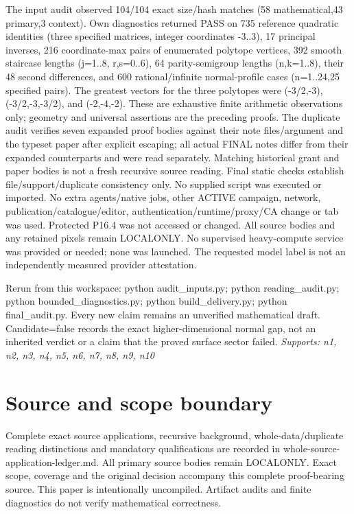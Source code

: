 \documentclass[11pt]{article}
\begin{document}
The input audit observed 104/104 exact size/hash matches (58 mathematical,43 primary,3 context). Own diagnostics returned PASS on 735 reference quadratic identities (three specified matrices, integer coordinates -3..3), 17 principal inverses, 216 coordinate-max pairs of enumerated polytope vertices, 392 smooth staircase lengths (j=1..8, r,s=0..6), 64 parity-semigroup lengths (n,k=1..8), their 48 second differences, and 600 rational/infinite normal-profile cases (n=1..24,25 specified pairs). The greatest vectors for the three polytopes were (-3/2,-3), (-3/2,-3,-3/2), and (-2,-4,-2). These are exhaustive finite arithmetic observations only; geometry and universal assertions are the preceding proofs. The duplicate audit verifies seven expanded proof bodies against their note files/argument and the typeset paper after explicit escaping; all actual FINAL notes differ from their expanded counterparts and were read separately. Matching historical grant and paper bodies is not a fresh recursive source reading. Final static checks establish file/support/duplicate consistency only. No supplied script was executed or imported. No extra agents/native jobs, other ACTIVE campaign, network, publication/catalogue/editor, authentication/runtime/proxy/CA change or tab was used. Protected P16.4 was not accessed or changed. All source bodies and any retained pixels remain LOCALONLY. No supervised heavy-compute service was provided or needed; none was launched. The requested model label is not an independently measured provider attestation.

Rerun from this workspace: python audit\_inputs.py; python reading\_audit.py; python bounded\_diagnostics.py; python build\_delivery.py; python final\_audit.py. Every new claim remains an unverified mathematical draft. Candidate=false records the exact higher-dimensional normal gap, not an inherited verdict or a claim that the proved surface sector failed.
\textit{Supports: n1, n2, n3, n4, n5, n6, n7, n8, n9, n10}

\section*{Source and scope boundary}
Complete exact source applications, recursive background, whole-data/duplicate reading distinctions and mandatory qualifications are recorded in whole-source-application-ledger.md. All primary source bodies remain LOCALONLY. Exact scope, coverage and the original decision accompany this complete proof-bearing source. This paper is intentionally uncompiled. Artifact audits and finite diagnostics do not verify mathematical correctness.
\end{document}
